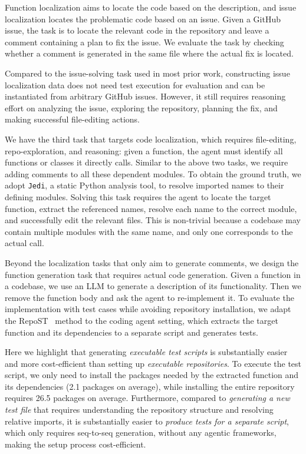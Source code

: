 \documentclass{article}
\theoremstyle{plain}
\theoremstyle{definition}
\theoremstyle{remark}
\begin{document}
Function localization aims to locate the code based on the description, and issue localization locates the problematic code based on an issue.
Given a GitHub issue, the task is to locate the relevant code in the repository and leave a comment containing a plan to fix the issue.
We evaluate the task by checking whether a comment is generated in the same file where the actual fix is located. 

Compared to the issue-solving task used in most prior work, constructing issue localization data does not need test execution for evaluation and can be instantiated from arbitrary GitHub issues.
However, it still requires reasoning effort on analyzing the issue, exploring the repository, planning the fix, and making successful file-editing actions.

We have the third task that targets code localization, which requires file-editing, repo-exploration, and reasoning: given a function, the agent must identify all functions or classes it directly calls.
Similar to the above two tasks, we require adding comments to all these dependent modules.
To obtain the ground truth, we adopt \texttt{Jedi}, a static Python analysis tool, to resolve imported names to their defining modules.
Solving this task requires the agent to locate the target function, extract the referenced names, resolve each name to the correct module, and successfully edit the relevant files.
This is non-trivial because a codebase may contain multiple modules with the same name, and only one corresponds to the actual call.

Beyond the localization tasks that only aim to generate comments, we design the function generation task that requires actual code generation. 
Given a function in a codebase, we use an LLM to generate a description of its functionality.
Then we remove the function body and ask the agent to re-implement it.
To evaluate the implementation with test cases while avoiding repository installation, we adapt the RepoST~\cite{repost} method to the coding agent setting, which extracts the target function and its dependencies to a separate script and generates tests.

Here we highlight that generating \emph{executable test scripts} is substantially easier and more cost-efficient than setting up \emph{executable repositories}.
To execute the test script, we only need to install the packages needed by the extracted function and its dependencies (2.1 packages on average), while installing the entire repository requires 26.5 packages on average.
Furthermore, compared to \emph{generating a new test file} that requires understanding the repository structure and resolving relative imports, it is substantially easier to \emph{produce tests for a separate script}, which only requires seq-to-seq generation, without any agentic frameworks, making the setup process cost-efficient.
\end{document}
